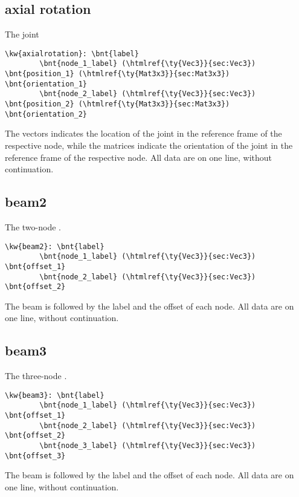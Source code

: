 \subsection{axial rotation}
The  joint
\begin{Verbatim}[commandchars=\\\{\}]
    \kw{axialrotation}: \bnt{label}
        \bnt{node_1_label} (\htmlref{\ty{Vec3}}{sec:Vec3}) \bnt{position_1} (\htmlref{\ty{Mat3x3}}{sec:Mat3x3}) \bnt{orientation_1}
        \bnt{node_2_label} (\htmlref{\ty{Vec3}}{sec:Vec3}) \bnt{position_2} (\htmlref{\ty{Mat3x3}}{sec:Mat3x3}) \bnt{orientation_2}
\end{Verbatim}
The  vectors indicates the location of the joint
in the reference frame of the respective node,
while the  matrices indicate the orientation of the joint
in the reference frame of the respective node.
All data are on one line, without continuation.

\subsection{beam2}
The two-node .
\begin{Verbatim}[commandchars=\\\{\}]
    \kw{beam2}: \bnt{label}
        \bnt{node_1_label} (\htmlref{\ty{Vec3}}{sec:Vec3}) \bnt{offset_1}
        \bnt{node_2_label} (\htmlref{\ty{Vec3}}{sec:Vec3}) \bnt{offset_2}
\end{Verbatim}
The beam  is followed by the label and the offset of each node.
All data are on one line, without continuation.

\subsection{beam3}
The three-node .
\begin{Verbatim}[commandchars=\\\{\}]
    \kw{beam3}: \bnt{label}
        \bnt{node_1_label} (\htmlref{\ty{Vec3}}{sec:Vec3}) \bnt{offset_1}
        \bnt{node_2_label} (\htmlref{\ty{Vec3}}{sec:Vec3}) \bnt{offset_2}
        \bnt{node_3_label} (\htmlref{\ty{Vec3}}{sec:Vec3}) \bnt{offset_3}
\end{Verbatim}
The beam  is followed by the label and the offset of each node.
All data are on one line, without continuation.

